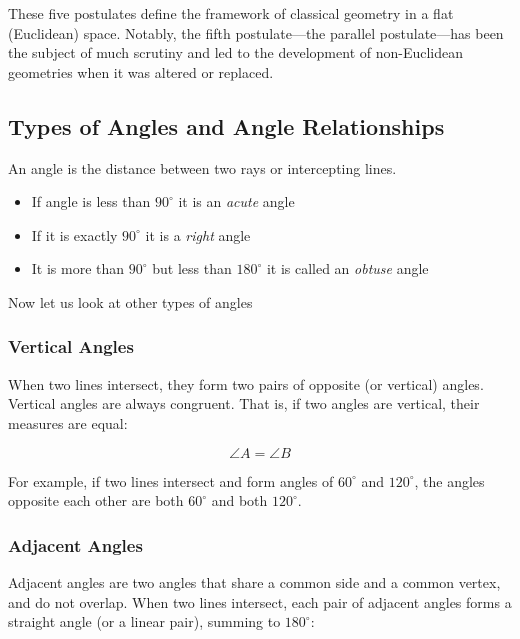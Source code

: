 These five postulates define the framework of classical geometry in a flat (Euclidean) space. Notably, 
the fifth postulate—the parallel postulate—has been the subject of much scrutiny and led to the 
development of non-Euclidean geometries when it was altered or replaced.

\subsection{Types of Angles and Angle Relationships}

An angle is the distance between two rays or intercepting lines.

\begin{itemize}

	\item If angle is less than \(90^\circ\) it is an \emph{acute} angle

	\item If it is exactly \(90^\circ\) it is a \emph{right} angle

	\item It is more than \(90^\circ\) but less than \(180^\circ\) it is called an \emph{obtuse} angle

\end{itemize}

Now let us look at other types of angles

\subsubsection{Vertical Angles}

When two lines intersect, they form two pairs of opposite (or vertical) angles. Vertical angles are 
always congruent. That is, if two angles are vertical, their measures are equal:

\[
	\angle A = \angle B
\]

For example, if two lines intersect and form angles of \( 60^\circ \) and \( 120^\circ \), the angles 
opposite each other are both \( 60^\circ \) and both \( 120^\circ \).

\subsubsection{Adjacent Angles}

Adjacent angles are two angles that share a common side and a common vertex, and do not overlap. When two 
lines intersect, each pair of adjacent angles forms a straight angle (or a linear pair), summing to 
\(180^\circ\):

